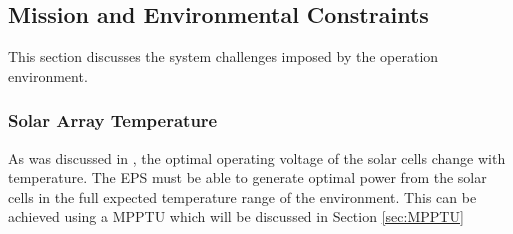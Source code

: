 \subsection{Mission and Environmental Constraints}
\label{subsec:environmental_requirements}
This section discusses the system challenges imposed by the operation environment.
%
\subsubsection*{Solar Array Temperature}
As was discussed in \cite{PDR}, the optimal operating voltage of the solar cells change with temperature. The \ac{EPS} must be able to generate optimal power from the solar cells in the full expected temperature range of the environment. This can be achieved using a \ac{MPPTU} which will be discussed in Section \ref{sec:MPPTU}
%
